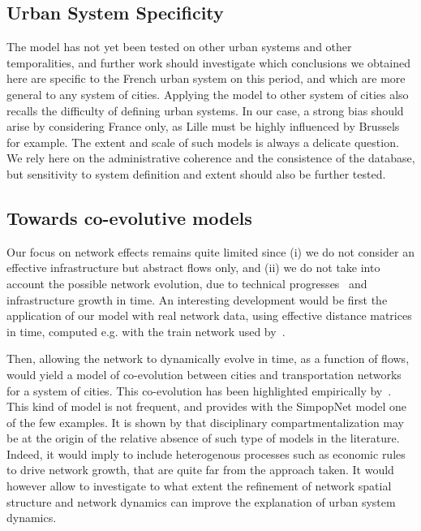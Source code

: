 \documentclass{article}
\begin{document}
\subsection*{Urban System Specificity}


The model has not yet been tested on other urban systems and other temporalities, and further work should investigate which conclusions we obtained here are specific to the French urban system on this period, and which are more general to any system of cities. Applying the model to other system of cities also recalls the difficulty of defining urban systems. In our case, a strong bias should arise by considering France only, as Lille must be highly influenced by Brussels for example. The extent and scale of such models is always a delicate question. We rely here on the administrative coherence and the consistence of the database, but sensitivity to system definition and extent should also be further tested.



\subsection*{Towards co-evolutive models}

Our focus on network effects remains quite limited since (i) we do not consider an effective infrastructure but abstract flows only, and (ii) we do not take into account the possible network evolution, due to technical progresses~\citep{bretagnolle2000long} and infrastructure growth in time. An interesting development would be first the application of our model with real network data, using effective distance matrices in time, computed e.g. with the train network used by~\cite{thevenin2013mapping}.

Then, allowing the network to dynamically evolve in time, as a function of flows, would yield a model of co-evolution between cities and transportation networks for a system of cities. This co-evolution has been highlighted empirically by~\cite{bretagnolle:tel-00459720}. This kind of model is not frequent, and \cite{schmitt2014modelisation} provides with the SimpopNet model one of the few examples. It is shown by \cite{raimbault2016models} that disciplinary compartmentalization may be at the origin of the relative absence of such type of models in the literature. Indeed, it would imply to include heterogenous processes such as economic rules to drive network growth, that are quite far from the approach taken. It would however allow to investigate to what extent the refinement of network spatial structure and network dynamics can improve the explanation of urban system dynamics.
\end{document}
